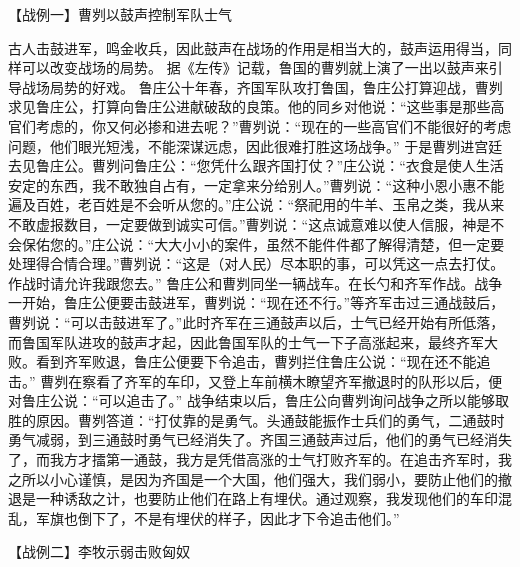 \documentclass[a4paper,12pt,UTF8,twoside]{ctexbook}
\begin{document}
【战例一】曹刿以鼓声控制军队士气

古人击鼓进军，鸣金收兵，因此鼓声在战场的作用是相当大的，鼓声运用得当，同样可以改变战场的局势。
据《左传》记载，鲁国的曹刿就上演了一出以鼓声来引导战场局势的好戏。
鲁庄公十年春，齐国军队攻打鲁国，鲁庄公打算迎战，曹刿求见鲁庄公，打算向鲁庄公进献破敌的良策。他的同乡对他说：“这些事是那些高官们考虑的，你又何必掺和进去呢？”曹刿说：“现在的一些高官们不能很好的考虑问题，他们眼光短浅，不能深谋远虑，因此很难打胜这场战争。”
于是曹刿进宫廷去见鲁庄公。曹刿问鲁庄公：“您凭什么跟齐国打仗？”庄公说：“衣食是使人生活安定的东西，我不敢独自占有，一定拿来分给别人。”曹刿说：“这种小恩小惠不能遍及百姓，老百姓是不会听从您的。”庄公说：“祭祀用的牛羊、玉帛之类，我从来不敢虚报数目，一定要做到诚实可信。”曹刿说：“这点诚意难以使人信服，神是不会保佑您的。”庄公说：“大大小小的案件，虽然不能件件都了解得清楚，但一定要处理得合情合理。”曹刿说：“这是（对人民）尽本职的事，可以凭这一点去打仗。作战时请允许我跟您去。”
鲁庄公和曹刿同坐一辆战车。在长勺和齐军作战。战争一开始，鲁庄公便要击鼓进军，曹刿说：“现在还不行。”等齐军击过三通战鼓后，曹刿说：“可以击鼓进军了。”此时齐军在三通鼓声以后，士气已经开始有所低落，而鲁国军队进攻的鼓声才起，因此鲁国军队的士气一下子高涨起来，最终齐军大败。看到齐军败退，鲁庄公便要下令追击，曹刿拦住鲁庄公说：“现在还不能追击。”
曹刿在察看了齐军的车印，又登上车前横木瞭望齐军撤退时的队形以后，便对鲁庄公说：“可以追击了。”
战争结束以后，鲁庄公向曹刿询问战争之所以能够取胜的原因。曹刿答道：“打仗靠的是勇气。头通鼓能振作士兵们的勇气，二通鼓时勇气减弱，到三通鼓时勇气已经消失了。齐国三通鼓声过后，他们的勇气已经消失了，而我方才擂第一通鼓，我方是凭借高涨的士气打败齐军的。在追击齐军时，我之所以小心谨慎，是因为齐国是一个大国，他们强大，我们弱小，要防止他们的撤退是一种诱敌之计，也要防止他们在路上有埋伏。通过观察，我发现他们的车印混乱，军旗也倒下了，不是有埋伏的样子，因此才下令追击他们。”


【战例二】李牧示弱击败匈奴
\end{document}
